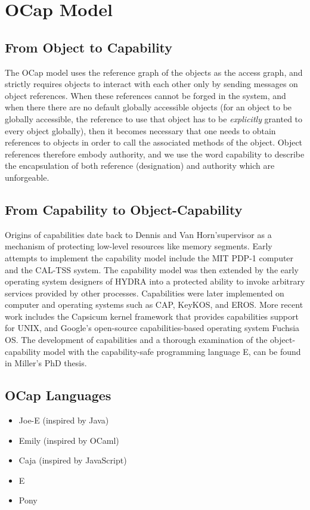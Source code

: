 \documentclass[a4paper,11pt, twoside,twocolumn]{article}
\begin{document}
\section{OCap Model}
\subsection{From Object to Capability}
The OCap model uses the reference graph of the objects as the access graph, and strictly requires objects to interact with each other only by sending messages on object references\cite{miller2003b}. When these references cannot be forged in the system, and when there there are no default globally accessible objects (for an object to be globally accessible, the reference to use that object has to be \textit{explicitly} granted to every object globally), then it becomes necessary that one needs to obtain references to objects in order to call the associated methods of the object.  Object references therefore embody authority, and we use the word capability to describe the encapsulation of both reference (designation) and authority which are unforgeable. 

\subsection{From Capability to Object-Capability}
Origins of capabilities date back to Dennis and Van Horn\cite{dennis1966}'supervisor as a mechanism of protecting low-level resources like memory segments. Early attempts to implement the capability model include the MIT PDP-1 computer and the CAL-TSS system. The capability model was then extended by the early operating system designers of HYDRA\cite{wulf1974} into a protected ability to invoke arbitrary services provided by other processes. Capabilities were later implemented on computer and operating systems such as CAP\cite{wilkes1979}, KeyKOS\cite{hardy1985}, and EROS\cite{shapiro1999}. More recent work includes the Capsicum kernel framework that provides capabilities support for UNIX\cite{watson2010}, and Google's open-source capabilities-based operating system Fuchsia OS\cite{matte2017}. The development of capabilities and a thorough examination of the object-capability model with the capability-safe programming language E, can be found in Miller's PhD thesis\cite{miller2006}.

\subsection{OCap Languages}
\begin{itemize}
\item Joe-E (inspired by Java)
\item Emily (inspired by OCaml)
\item Caja (inspired by JavaScript)
\item E
\item Pony
\end{itemize}
\end{document}
